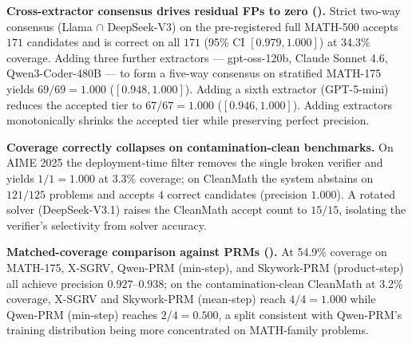\documentclass{article}
\begin{document}
\textbf{Cross-extractor consensus drives residual FPs to zero ().} Strict two-way consensus (Llama $\cap$ DeepSeek-V3) on the pre-registered full MATH-500 accepts $171$ candidates and is correct on all $171$ (95\% CI $[0.979, 1.000]$) at 34.3\% coverage. Adding three further extractors --- gpt-oss-120b, Claude Sonnet 4.6, Qwen3-Coder-480B --- to form a five-way consensus on stratified MATH-175 yields $69/69 = 1.000$ ($[0.948, 1.000]$). Adding a sixth extractor (GPT-5-mini) reduces the accepted tier to $67/67 = 1.000$ ($[0.946, 1.000]$). Adding extractors monotonically shrinks the accepted tier while preserving perfect precision.

\textbf{Coverage correctly collapses on contamination-clean benchmarks.} On AIME 2025 the deployment-time filter removes the single broken verifier and yields $1/1 = 1.000$ at 3.3\% coverage; on CleanMath the system abstains on $121/125$ problems and accepts $4$ correct candidates (precision $1.000$). A rotated solver (DeepSeek-V3.1) raises the CleanMath accept count to $15/15$, isolating the verifier's selectivity from solver accuracy.

\textbf{Matched-coverage comparison against PRMs ().} At 54.9\% coverage on MATH-175, X-SGRV, Qwen-PRM (min-step), and Skywork-PRM (product-step) all achieve precision $0.927$--$0.938$; on the contamination-clean CleanMath at 3.2\% coverage, X-SGRV and Skywork-PRM (mean-step) reach $4/4 = 1.000$ while Qwen-PRM (min-step) reaches $2/4 = 0.500$, a split consistent with Qwen-PRM's training distribution being more concentrated on MATH-family problems.

\begin{table}[t]
\centering
\caption{\textbf{X-SGRV top-tier precision across extractors, benchmarks, and consensus configurations.} ``Cov.'' is the size of the top tier; ``Prec.'' is 95\% Clopper-Pearson. CleanMath = HMMT-Feb + BRUMO + SMT + APEX 2025 ($n{=}125$).}
\label{tab:main}
\end{table}
\end{document}
